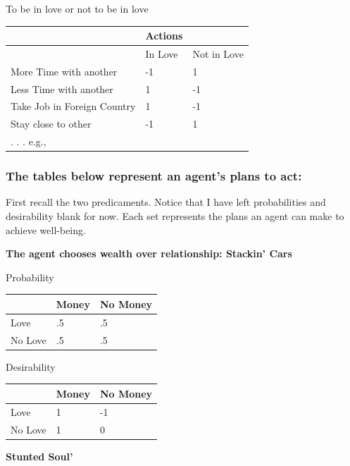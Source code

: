 \documentclass[
  letterpaper,
  DIV=11,
  numbers=noendperiod]{scrartcl}
\newcounter{none} %
\begin{document}
To be in love or not to be in love

{\def\LTcaptype{none} %
\begin{longtable}[]{@{}lll@{}}
\toprule\noalign{}
& Actions & \\
\midrule\noalign{}
\endhead
\bottomrule\noalign{}
\endlastfoot
& In Love & Not in Love \\
More Time with another & -1 & 1 \\
Less Time with another & 1 & -1 \\
Take Job in Foreign Country & 1 & -1 \\
Stay close to other & -1 & 1 \\
. . . e.g., & & \\
\end{longtable}
}

\subsubsection{The tables below represent an agent's plans to
act:}\label{the-tables-below-represent-an-agents-plans-to-act}

First recall the two predicaments. Notice that I have left probabilities
and desirability blank for now. Each set represents the plans an agent
can make to achieve well-being.

\textbf{The agent chooses wealth over relationship: Stackin' Cars}

Probability

{\def\LTcaptype{none} %
\begin{longtable}[]{@{}lll@{}}
\toprule\noalign{}
& Money & No Money \\
\midrule\noalign{}
\endhead
\bottomrule\noalign{}
\endlastfoot
Love & .5 & .5 \\
No Love & .5 & .5 \\
\end{longtable}
}

Desirability

{\def\LTcaptype{none} %
\begin{longtable}[]{@{}lll@{}}
\toprule\noalign{}
& Money & No Money \\
\midrule\noalign{}
\endhead
\bottomrule\noalign{}
\endlastfoot
Love & 1 & -1 \\
No Love & 1 & 0 \\
\end{longtable}
}

\textbf{Stunted Soul'}
\end{document}
